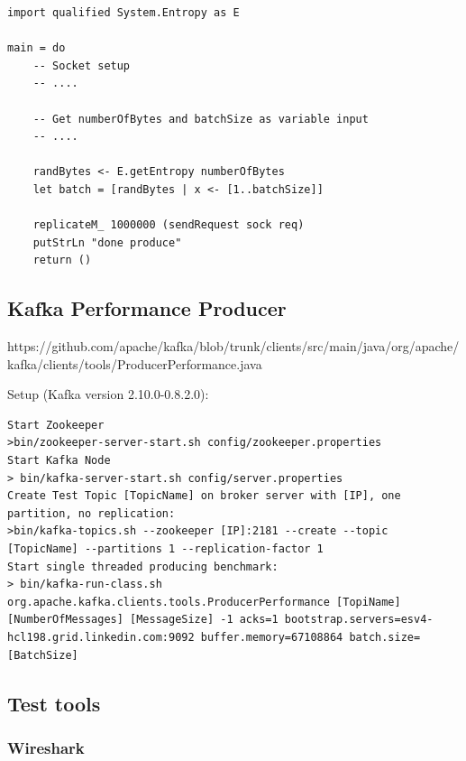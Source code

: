 \begin{lstlisting}
import qualified System.Entropy as E

main = do 
    -- Socket setup 
    -- ....

    -- Get numberOfBytes and batchSize as variable input 
    -- ....

    randBytes <- E.getEntropy numberOfBytes 
    let batch = [randBytes | x <- [1..batchSize]]

    replicateM_ 1000000 (sendRequest sock req) 
    putStrLn "done produce"
    return ()

\end{lstlisting}

\subsection{Kafka Performance Producer}
\label{conc-eval-kafkaperformanceprod}

{https://github.com/apache/kafka/blob/trunk/clients/src/main/java/org/apache/kafka/clients/tools/ProducerPerformance.java}

Setup (Kafka version 2.10.0-0.8.2.0):
 
\begin{verbatim}
Start Zookeeper
>bin/zookeeper-server-start.sh config/zookeeper.properties
Start Kafka Node 
> bin/kafka-server-start.sh config/server.properties
Create Test Topic [TopicName] on broker server with [IP], one partition, no replication: 
>bin/kafka-topics.sh --zookeeper [IP]:2181 --create --topic [TopicName] --partitions 1 --replication-factor 1
Start single threaded producing benchmark: 
> bin/kafka-run-class.sh org.apache.kafka.clients.tools.ProducerPerformance [TopiName] [NumberOfMessages] [MessageSize] -1 acks=1 bootstrap.servers=esv4-hcl198.grid.linkedin.com:9092 buffer.memory=67108864 batch.size=[BatchSize]
\end{verbatim}


\subsection{Test tools}
\subsubsection{Wireshark}

